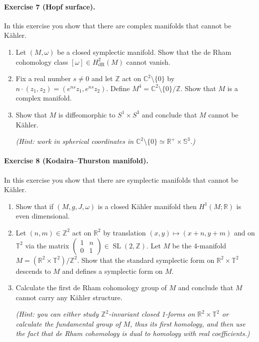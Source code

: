 \documentclass{article}
\theoremstyle{definition}
\DeclareMathOperator{\SL}{SL}
\newcommand{\dR}{\mathrm{dR}}
\renewcommand{\S}{\mathbb{S}}
\newcommand{\T}{\mathbb{T}}
\newcommand{\Z}{\mathbb{Z}}
\newcommand{\R}{\mathbb{R}}
\newcommand{\C}{\mathbb{C}}
\begin{document}
\paragraph{Exercise 7 {\normalfont(Hopf surface)}.} In this exercise you show
that there are complex manifolds that cannot be K\"ahler.
\begin{enumerate}[label=(\roman*)]
    \item Let $(M,\omega)$ be a closed symplectic manifold. Show that the de
        Rham cohomology class $[\omega]\in H^2_\dR(M)$ cannot vanish.

    \item Fix a real number $s\ne0$ and let $\Z$ act on $\C^2\setminus\{0\}$ by
        $n\cdot(z_1,z_2)=(e^{ns}z_1,e^{ns}z_2)$. Define
        $M^4=\C^2\setminus\{0\}/\Z$. Show that $M$ is a complex manifold.

    \item Show that $M$ is diffeomorphic to $S^1\times S^3$ and conclude that
        $M$ cannot be K\"ahler.

        \textit{(Hint: work in spherical coordinates in
        $\C^2\setminus\{0\}\simeq\R^+\times\S^3$.)}
\end{enumerate}

\paragraph{Exercise 8 {\normalfont(Kodaira--Thurston manifold)}.} In this
exercise you show that there are symplectic manifolds that cannot be K\"ahler.
\begin{enumerate}[label=(\roman*)]
    \item Show that if $(M,g,J,\omega)$ is a closed K\"ahler manifold then
        $H^1(M;\R)$ is even dimensional.
    \item Let $(n,m)\in\Z^2$ act on $\R^2$ by translation
        $(x,y)\mapsto(x+n,y+m)$ and on $\T^2$ via the matrix
        $\begin{pmatrix}1&n\\0&1\end{pmatrix}\in\SL(2,\Z)$. Let $M$ be the
        4-manifold $M=(\R^2\times\T^2)/\Z^2$. Show that the standard symplectic
        form on $\R^2\times\T^2$ descends to $M$ and defines a symplectic form
        on $M$.

    \item Calculate the first de Rham cohomology group of $M$ and conclude that
        $M$ cannot carry any K\"ahler structure.

        \textit{(Hint: you can either study $\Z^2$-invariant closed 1-forms on
        $\R^2\times\T^2$ or calculate the fundamental group of $M$, thus its
        first homology, and then use the fact that de Rham cohomology is dual
        to homology with real coefficients.)}
\end{enumerate}
\end{document}
